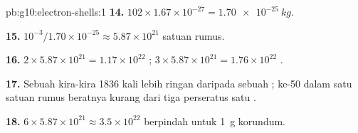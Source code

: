 \begin{solution}{pb:g10:electron-shells:1}
\textbf{14.} $102 \times 1.67 \times 10^{-27} = \qty{1.70e-25}{kg}$.

\textbf{15.} $10^{-3} / 1.70 \times 10^{-25} \approx 5.87 \times 10^{21}$
satuan rumus.

\textbf{16.} $2 \times 5.87 \times 10^{21} = 1.17 \times 10^{22}$
 ; $3 \times 5.87 \times 10^{21} = 1.76 \times 10^{22}$
 .

\textbf{17.} Sebuah  kira-kira 1836 kali lebih ringan daripada
sebuah ; ke-50  dalam satu satuan rumus beratnya kurang
dari tiga perseratus satu .

\textbf{18.} $6 \times 5.87 \times 10^{21} \approx 3.5 \times 10^{22}$
 berpindah untuk \qty{1}{g} korundum.
\end{solution}
